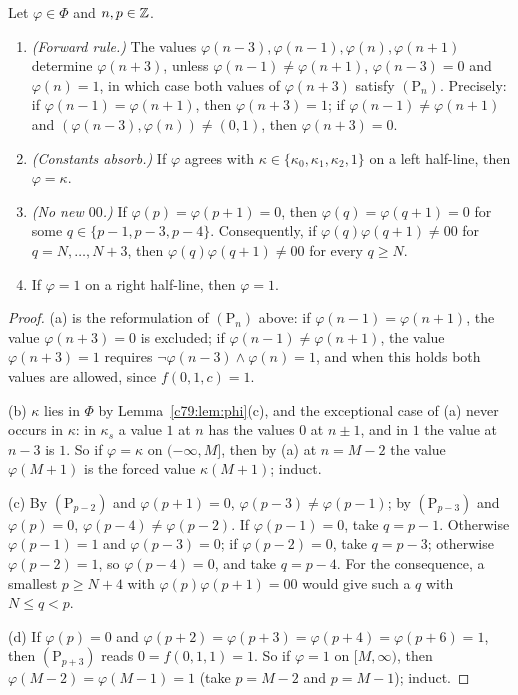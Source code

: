 \begin{lemma}\label{c79:lem:Phirules}
Let $\varphi\in\Phi$ and $n,p\in\mathbb{Z}$.
\begin{enumerate}
\item[(a)] \emph{(Forward rule.)} The values $\varphi(n-3),\varphi(n-1),\varphi(n),\varphi(n+1)$ determine $\varphi(n+3)$, unless $\varphi(n-1)\ne\varphi(n+1)$, $\varphi(n-3)=0$ and $\varphi(n)=1$, in which case both values of $\varphi(n+3)$ satisfy $(\mathrm P_n)$. Precisely: if $\varphi(n-1)=\varphi(n+1)$, then $\varphi(n+3)=1$; if $\varphi(n-1)\ne\varphi(n+1)$ and $(\varphi(n-3),\varphi(n))\ne(0,1)$, then $\varphi(n+3)=0$.
\item[(b)] \emph{(Constants absorb.)} If $\varphi$ agrees with $\kappa\in\{\kappa_0,\kappa_1,\kappa_2,1\}$ on a left half-line, then $\varphi=\kappa$.
\item[(c)] \emph{(No new $00$.)} If $\varphi(p)=\varphi(p+1)=0$, then $\varphi(q)=\varphi(q+1)=0$ for some $q\in\{p-1,p-3,p-4\}$. Consequently, if $\varphi(q)\varphi(q+1)\ne00$ for $q=N,\dots,N+3$, then $\varphi(q)\varphi(q+1)\ne00$ for every $q\ge N$.
\item[(d)] If $\varphi=1$ on a right half-line, then $\varphi=1$.
\end{enumerate}
\end{lemma}

\begin{proof}
(a) is the reformulation of $(\mathrm P_n)$ above: if $\varphi(n-1)=\varphi(n+1)$, the value $\varphi(n+3)=0$ is excluded; if $\varphi(n-1)\ne\varphi(n+1)$, the value $\varphi(n+3)=1$ requires $\neg\varphi(n-3)\wedge\varphi(n)=1$, and when this holds both values are allowed, since $f(0,1,c)=1$.

(b) $\kappa$ lies in $\Phi$ by Lemma~\ref{c79:lem:phi}(c), and the exceptional case of (a) never occurs in $\kappa$: in $\kappa_s$ a value $1$ at $n$ has the values $0$ at $n\pm1$, and in $1$ the value at $n-3$ is $1$. So if $\varphi=\kappa$ on $(-\infty,M]$, then by (a) at $n=M-2$ the value $\varphi(M+1)$ is the forced value $\kappa(M+1)$; induct.

(c) By $(\mathrm P_{p-2})$ and $\varphi(p+1)=0$, $\varphi(p-3)\ne\varphi(p-1)$; by $(\mathrm P_{p-3})$ and $\varphi(p)=0$, $\varphi(p-4)\ne\varphi(p-2)$. If $\varphi(p-1)=0$, take $q=p-1$. Otherwise $\varphi(p-1)=1$ and $\varphi(p-3)=0$; if $\varphi(p-2)=0$, take $q=p-3$; otherwise $\varphi(p-2)=1$, so $\varphi(p-4)=0$, and take $q=p-4$. For the consequence, a smallest $p\ge N+4$ with $\varphi(p)\varphi(p+1)=00$ would give such a $q$ with $N\le q<p$.

(d) If $\varphi(p)=0$ and $\varphi(p+2)=\varphi(p+3)=\varphi(p+4)=\varphi(p+6)=1$, then $(\mathrm P_{p+3})$ reads $0=f(0,1,1)=1$. So if $\varphi=1$ on $[M,\infty)$, then $\varphi(M-2)=\varphi(M-1)=1$ (take $p=M-2$ and $p=M-1$); induct.
\end{proof}

